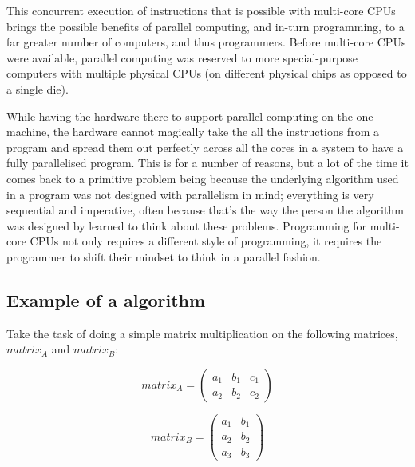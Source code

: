 \documentclass[a4paper,11pt]{article}
\begin{document}
This concurrent execution of instructions that is possible with multi-core CPUs brings the possible benefits of parallel computing, and in-turn programming, to a far greater number of computers, and thus programmers.
Before multi-core CPUs were available, parallel computing was reserved to more special-purpose computers with multiple physical CPUs (on different physical chips as opposed to a single die).

While having the hardware there to support parallel computing on the one machine, the hardware cannot magically take the all the instructions from a program and spread them out perfectly across all the cores in a system to have a fully parallelised program. This is for a number of reasons, but a lot of the time it comes back to a primitive problem being because the underlying algorithm used in a program was not designed with parallelism in mind; everything is very sequential and imperative, often because that's the way the person the algorithm was designed by learned to think about these problems.
Programming for multi-core CPUs not only requires a different style of programming, it requires the programmer to shift their mindset to think in a parallel fashion.

\subsection{Example of a  algorithm} %
\label{sub:example_of_a_vs}
Take the task of doing a simple matrix multiplication on the following matrices, $matrix_A$ and $matrix_B$:

\begin{displaymath}
matrix_A =
  \begin{pmatrix}
    a_1 & b_1 & c_1 \\
    a_2 & b_2 & c_2
  \end{pmatrix}
\end{displaymath}

\begin{displaymath}
matrix_B =
  \begin{pmatrix}
    a_1 & b_1 \\
    a_2 & b_2 \\
    a_3 & b_3
  \end{pmatrix}
\end{displaymath}
\end{document}
